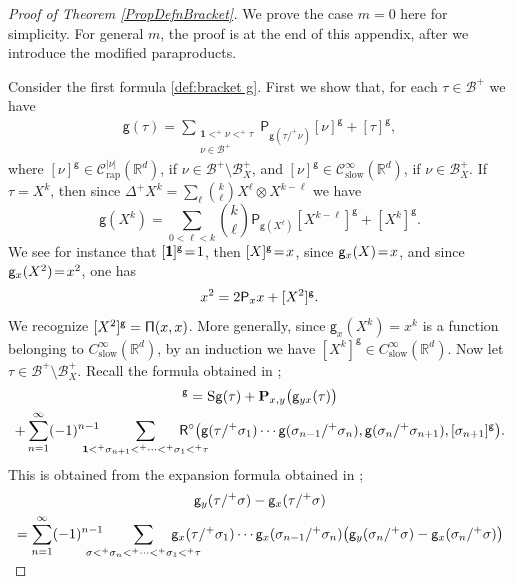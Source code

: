 \documentclass[10pt]{amsart}
\theoremstyle{plain}
\theoremstyle{definition}
\newcommand{\unit}{\mathbf{1}}
\newcommand{\rap}{\mathrm{rap}}
\newcommand{\slow}{\mathrm{slow}}
\newcommand{\bfP}{\mathbf{P}}
\newcommand{\sfP}{\mathsf{P}}
\newcommand{\sfR}{\mathsf{R}}
\newcommand{\sfg}{\mathsf{g}}
\newcommand{\bbR}{\mathbb{R}}
\newcommand{\mcB}{\mathcal{B}}
\newcommand{\mcC}{\mathcal{C}}
\begin{document}
\begin{proof}[Proof of Theorem \ref{PropDefnBracket}]
We prove the case $m=0$ here for simplicity. For general $m$, the proof is at the end of this appendix, after we introduce the modified paraproducts.

Consider the first formula \eqref{def:bracket g}. First we show that, for each $\tau\in\mcB^+$ we have
\begin{align}\label{predef:bracket g}
\sfg(\tau)=\sum_{\substack{\unit<^+\nu<^+\tau\\ \nu\in\mcB^+}}\sfP_{\sfg(\tau/^+\nu)}[\nu]^\sfg+[\tau]^\sfg,
\end{align}
where $[\nu]^\sfg\in \mcC_\rap^{|\nu|}(\bbR^d)$, if $\nu\in\mcB^+\setminus\mcB_X^+$, and $[\nu]^\sfg\in \mcC_\slow^\infty(\bbR^d)$, if $\nu\in\mcB_X^+$. If $\tau=X^k$, then since $\Delta^+X^k=\sum_{\ell}\binom{k}{\ell}X^\ell\otimes X^{k-\ell}$ we have
\[
\sfg(X^k)=\sum_{0<\ell<k}\binom{k}{\ell}\sfP_{\sfg(X^\ell)}[X^{k-\ell}]^\sfg+[X^k]^\sfg.
\]
We see for instance that $[\boldsymbol{\mathsf{1}}]^{\sf g}\!=\!1$, then $[X]^{\sf g}\!=\!x$, since ${\sf g}_x(X)\!=\!x$, and since ${\sf g}_x(X^2)\!=\!x^2$, one has
\[
x^2 = 2{\sf P}_xx + [X^2]^{\sf g}.
\]
We recognize $[X^2]^{\sf g}={\sf \Pi}(x,x)$. More generally, since $\sfg_x(X^k)=x^k$ is a function belonging to $C_\slow^\infty(\bbR^d)$, by an induction we have $[X^k]^\sfg\in C_\slow^\infty(\bbR^d)$. Now let $\tau\in\mcB^+\setminus\mcB_X^+$. Recall the formula obtained in \cite{BH};
\begin{multline*}
[\tau]^\sfg = \textsc{S}\sfg(\tau)+\bfP_{x,y}\bigl(\sfg_{yx}(\tau)\bigr) \\
+ \sum_{n=1}^\infty(-1)^{n-1}\hspace*{-5mm}\sum_{\unit<^+\sigma_{n+1}<^+\cdots<^+\sigma_1<^+\tau}\hspace*{-8mm} {\sfR}^\circ\bigl(\sfg(\tau/^+\sigma_1)\cdots\sfg(\sigma_{n-1}/^+\sigma_n),\sfg(\sigma_n/^+\sigma_{n+1}),[\sigma_{n+1}]^\sfg\bigr).
\end{multline*}
This is obtained from the expansion formula obtained in \cite{BH};
\begin{multline}\label{expansion of g(tau/sigma)}
\sfg_y(\tau/^+\sigma)-\sfg_x(\tau/^+\sigma)\\
=\sum_{n=1}^\infty(-1)^{n-1}\hspace*{-5mm}\sum_{\sigma<^+\sigma_n<^+\cdots<^+\sigma_1<^+\tau}\hspace*{-8mm}
\sfg_x(\tau/^+\sigma_1)\cdots\sfg_x(\sigma_{n-1}/^+\sigma_n)\bigl(\sfg_y(\sigma_n/^+\sigma)-\sfg_x(\sigma_n/^+\sigma)\bigr)\\[-5pt]

\end{multline}
\end{proof}
\end{document}
